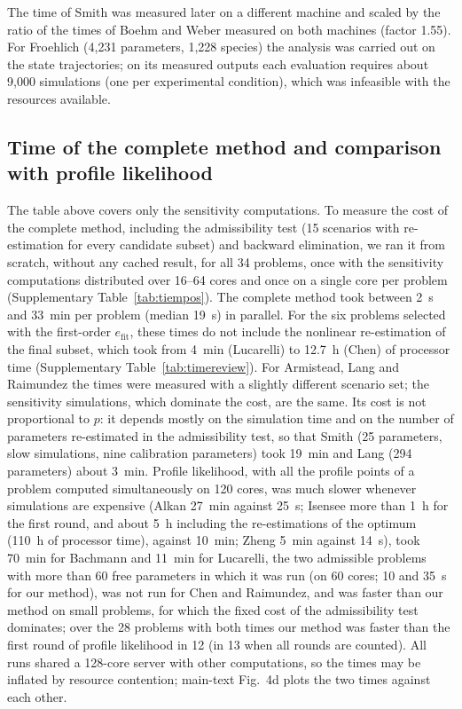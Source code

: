 The time of Smith was measured later on a different machine and scaled by the ratio of the times of Boehm and Weber measured on both machines (factor 1.55). For Froehlich (4,231 parameters, 1,228 species) the analysis was carried out on the state trajectories; on its measured outputs each evaluation requires about 9,000 simulations (one per experimental condition), which was infeasible with the resources available.


\subsection*{Time of the complete method and comparison with profile likelihood}

The table above covers only the sensitivity computations. To measure the cost of the complete method, including the admissibility test (15 scenarios with re-estimation for every candidate subset) and backward elimination, we ran it from scratch, without any cached result, for all 34 problems, once with the sensitivity computations distributed over 16--64 cores and once on a single core per problem (Supplementary Table~\ref{tab:tiempos}). The complete method took between 2~s and 33~min per problem (median 19~s) in parallel. For the six problems selected with the first-order $e_{\mathrm{fit}}$, these times do not include the nonlinear re-estimation of the final subset, which took from 4~min (Lucarelli) to 12.7~h (Chen) of processor time (Supplementary Table~\ref{tab:timereview}). For Armistead, Lang and Raimundez the times were measured with a slightly different scenario set; the sensitivity simulations, which dominate the cost, are the same. Its cost is not proportional to $p$: it depends mostly on the simulation time and on the number of parameters re-estimated in the admissibility test, so that Smith (25 parameters, slow simulations, nine calibration parameters) took 19~min and Lang (294 parameters) about 3~min. Profile likelihood, with all the profile points of a problem computed simultaneously on 120 cores, was much slower whenever simulations are expensive (Alkan 27~min against 25~s; Isensee more than 1~h for the first round, and about 5~h including the re-estimations of the optimum (110~h of processor time), against 10~min; Zheng 5~min against 14~s), took 70~min for Bachmann and 11~min for Lucarelli, the two admissible problems with more than 60 free parameters in which it was run (on 60 cores; 10 and 35~s for our method), was not run for Chen and Raimundez, and was faster than our method on small problems, for which the fixed cost of the admissibility test dominates; over the 28 problems with both times our method was faster than the first round of profile likelihood in 12 (in 13 when all rounds are counted). All runs shared a 128-core server with other computations, so the times may be inflated by resource contention; main-text Fig.~4d plots the two times against each other.

{\small

}
